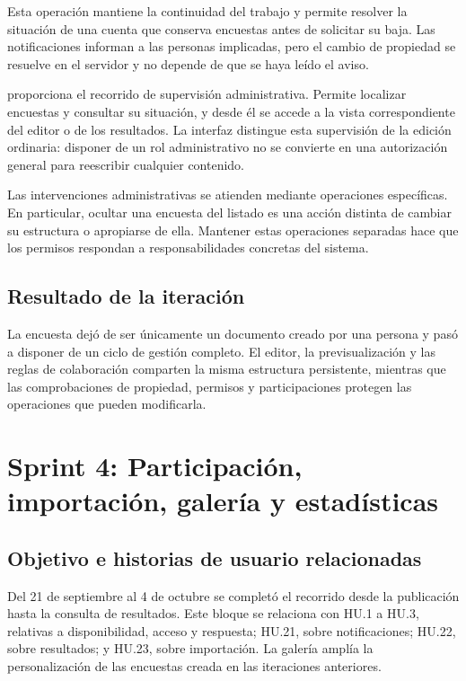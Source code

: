 \documentclass[11pt,a4paper]{report}
\newcommand{\code}[1]{\texttt{\small\detokenize{#1}}}
\begin{document}
Esta operación mantiene la continuidad del trabajo y permite resolver la situación de una cuenta que conserva encuestas antes de solicitar su baja. Las notificaciones informan a las personas implicadas, pero el cambio de propiedad se resuelve en el servidor y no depende de que se haya leído el aviso.

\code{AdminSurveysPage} proporciona el recorrido de supervisión administrativa. Permite localizar encuestas y consultar su situación, y desde él se accede a la vista correspondiente del editor o de los resultados. La interfaz distingue esta supervisión de la edición ordinaria: disponer de un rol administrativo no se convierte en una autorización general para reescribir cualquier contenido.

Las intervenciones administrativas se atienden mediante operaciones específicas. En particular, ocultar una encuesta del listado es una acción distinta de cambiar su estructura o apropiarse de ella. Mantener estas operaciones separadas hace que los permisos respondan a responsabilidades concretas del sistema.

\subsection{Resultado de la iteración}

La encuesta dejó de ser únicamente un documento creado por una persona y pasó a disponer de un ciclo de gestión completo. El editor, la previsualización y las reglas de colaboración comparten la misma estructura persistente, mientras que las comprobaciones de propiedad, permisos y participaciones protegen las operaciones que pueden modificarla.

\section{Sprint 4: Participación, importación, galería y estadísticas}
\subsection{Objetivo e historias de usuario relacionadas}

Del 21 de septiembre al 4 de octubre se completó el recorrido desde la publicación hasta la consulta de resultados. Este bloque se relaciona con HU.1 a HU.3, relativas a disponibilidad, acceso y respuesta; HU.21, sobre notificaciones; HU.22, sobre resultados; y HU.23, sobre importación. La galería amplía la personalización de las encuestas creada en las iteraciones anteriores.
\end{document}
